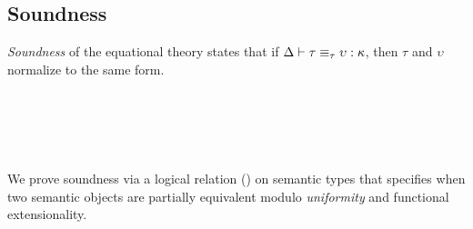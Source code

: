 \documentclass[sigplan,screen]{acmart}
\begin{document}
\subsection{Soundness}
\label{sec:soundness} 
\emph{Soundness}  of the equational theory states that if $\Delta \vdash \tau \equiv_{\tau} \upsilon : \kappa$, then $\tau$ and $\upsilon$ normalize to the same form.
\begin{AgdaAlign}
\begin{code}[hide]%
%
\>[2]\AgdaSpace{}%
\AgdaSpace{}%
\AgdaSymbol{\{}\AgdaSymbol{\}}\AgdaSpace{}%
\AgdaSymbol{\{}\AgdaSymbol{\}}\AgdaSpace{}%
\AgdaSymbol{(}\AgdaSpace{}%
\AgdaSpace{}%
\AgdaSymbol{:}\AgdaSpace{}%
\AgdaSpace{}%
\AgdaSpace{}%
\AgdaSymbol{)}\AgdaSpace{}%
\<%
\\
\>[2][@{}l@{\AgdaIndent{0}}]%
\>[4]\AgdaSpace{}%
\AgdaSpace{}%
\AgdaSpace{}%
\AgdaSymbol{;}\AgdaSpace{}%
\AgdaSpace{}%
\AgdaSpace{}%
\<%
\\
%
\>[4]\AgdaSpace{}%
\AgdaSpace{}%
\AgdaSpace{}%
\AgdaSymbol{;}\AgdaSpace{}%
\AgdaSpace{}%
\AgdaSpace{}%
\<%
\end{code} 
\begin{code}%
%
\>[4]\AgdaSpace{}%
\AgdaSymbol{:}\AgdaSpace{}%
\AgdaSpace{}%
\AgdaSpace{}%
\AgdaSpace{}%
\AgdaSpace{}%
\AgdaSpace{}%
\AgdaSpace{}%
\AgdaSpace{}%
\AgdaSpace{}%
\<%
\end{code}
\begin{code}[hide]%
%
\>[4]\AgdaSpace{}%
\AgdaSpace{}%
\AgdaSpace{}%
\<%
\\
%
\>[4]\AgdaSpace{}%
\AgdaSymbol{=}\AgdaSpace{}%
\<%
\end{code}
\end{AgdaAlign}

We prove soundness via a logical relation () on semantic types that specifies when two semantic objects are partially equivalent modulo \emph{uniformity} and functional extensionality.
\end{document}
